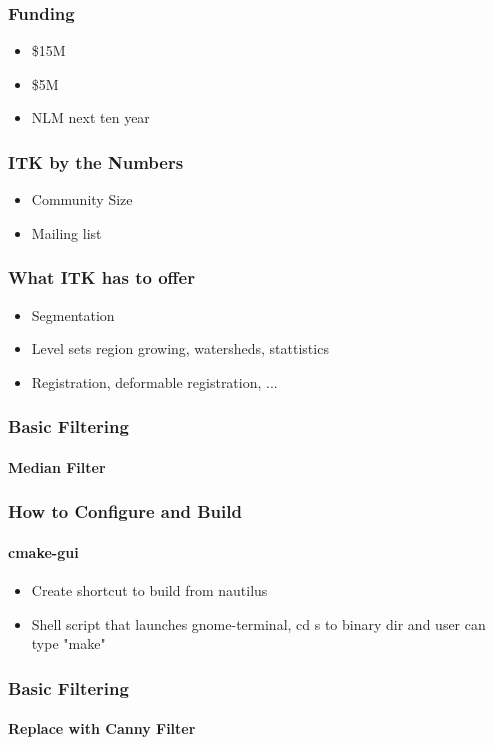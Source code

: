 \begin{frame}
\frametitle{Funding}
\begin{itemize}
\item \$15M
\pause
\item \$5M
\pause
\item NLM next ten year
\end{itemize}
\end{frame}


\begin{frame}
\frametitle{ITK by the Numbers}
\begin{itemize}
\item Community Size
\pause
\item Mailing list
\end{itemize}
\end{frame}


\begin{frame}
\frametitle{What ITK has to offer}
\begin{itemize}
\item Segmentation
\pause
\item Level sets region growing, watersheds, stattistics
\pause
\item Registration, deformable registration, ...
\end{itemize}
\end{frame}


\begin{frame}
\frametitle{Basic Filtering}
\framesubtitle{Median Filter}
\begin{center}

\end{center}
\end{frame}


\begin{frame}
\frametitle{How to Configure and Build}
\framesubtitle{cmake-gui}
\begin{itemize}
\item Create shortcut to build from nautilus
\item Shell script that launches gnome-terminal, cd s to binary dir and user can type "make"
\end{itemize}
\end{frame}


\begin{frame}
\frametitle{Basic Filtering}
\framesubtitle{Replace with Canny Filter}
\begin{center}

\end{center}
\end{frame}
